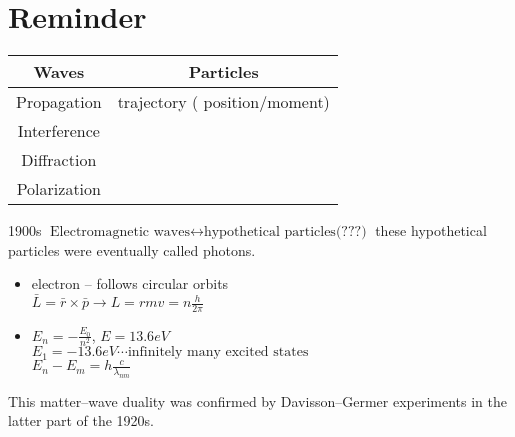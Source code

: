 
\chapter{Reminder}

\begin{center}
\begin{tabular}{|c|c|}

\hline
Waves & Particles \\
\hline
Propagation  & trajectory ( position/moment)\\
\hline
Interference & \\
\hline
Diffraction & \\
\hline
Polarization & \\
\hline
\end{tabular}
\end{center}

1900s
$\text{Electromagnetic waves} \leftrightarrow \text{hypothetical particles(???)}$ these hypothetical particles were eventually called photons.

{
    \begin{itemize}
        \item electron -- follows circular orbits\\
        $\bar{L} = \bar{r}\times \bar{p} \rightarrow L = r m v = n \frac{h}{2\pi}$
            \item $E_n = -\frac{E_0}{n^2}$, $E=13.6eV$ \\
                $E_1 = -13.6 eV\cdots \text{infinitely many excited states}$ \\
                $E_n - E_m = h \frac{c}{\lambda_{nm}}$

    \end{itemize}
}

This matter--wave duality was confirmed by Davisson--Germer experiments
in the latter part of the 1920s.


